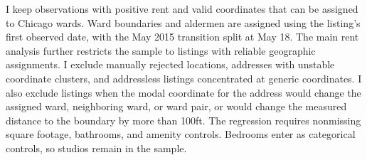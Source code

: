 I keep observations with positive rent and valid coordinates that can be assigned to Chicago wards.
Ward boundaries and aldermen are assigned using the listing's first observed date, with the May 2015 transition split at May 18.
The main rent analysis further restricts the sample to listings with reliable geographic assignments.
I exclude manually rejected locations, addresses with unstable coordinate clusters, and addressless listings concentrated at generic coordinates.
I also exclude listings when the modal coordinate for the address would change the assigned ward, neighboring ward, or ward pair, or would change the measured distance to the boundary by more than 100ft.
The regression requires nonmissing square footage, bathrooms, and amenity controls.
Bedrooms enter as categorical controls, so studios remain in the sample.
